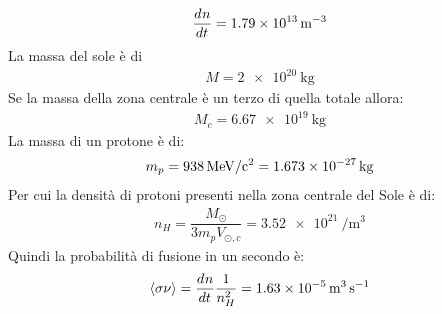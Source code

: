\documentclass[../main]{subfiles}
\begin{document}
\begin{svol}
	\begin{gather}
		\der[]{n}{t}=\SI{1.79e13}{\per\meter\cubed}
	\end{gather}
	La massa del sole è di
	\begin{gather*}
	M=\SI{2e20}{\kilo\gram}
	\end{gather*}
	Se la massa della zona centrale è un terzo di quella totale allora:
	\begin{gather}
	M_{c}=\SI{6.67e19}{\kilo\gram}
	\end{gather}
	La massa di un protone è di:
	\begin{gather*}
	m_{p}=\SI{938}{\mega\electronvolt\per c\squared}=\SI{1.673e-27}{\kilo\gram}
	\end{gather*}
	Per cui la densità di protoni presenti nella zona centrale del Sole è di:
	\begin{gather*}
	n_{H}=\dfrac{M_{\odot}}{3m_{p}V_{\odot,c}}= \SI{3.52e21}{\per\meter\cubed}
	\end{gather*}
	Quindi la probabilità di fusione in un secondo è:
	\begin{gather*}
	\left<\sigma\nu\right>=\der[]{n}{t}\dfrac{1}{n_{H}^{2}}=\SI{1.63e-5}{\meter\cubed\per\second}
	\end{gather*}
\end{svol}
\end{document}
